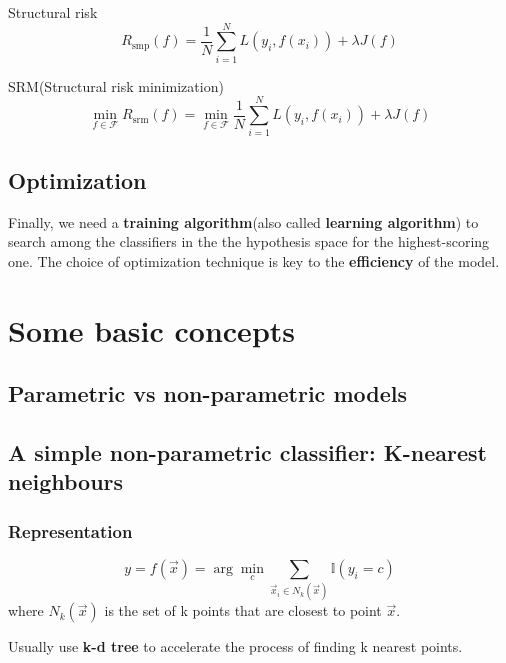 \begin{definition}
Structural risk
\begin{equation}
R_{\mathrm{smp}}(f)=\dfrac{1}{N}\sum\limits_{i=1}^{N} L\left(y_i,f(x_i)\right) +\lambda J(f)
\end{equation}
\end{definition}

\begin{definition}
SRM(Structural risk minimization)
\begin{equation}
\min\limits _{f \in \mathcal{F}} R_{\mathrm{srm}}(f)=\min\limits _{f \in \mathcal{F}} \dfrac{1}{N}\sum\limits_{i=1}^{N} L\left(y_i,f(x_i)\right) +\lambda J(f)
\end{equation}
\end{definition}


\subsection{Optimization}
Finally, we need a \textbf{training algorithm}(also called \textbf{learning algorithm}) to search among the classifiers in the the hypothesis space for the highest-scoring one. The choice of optimization technique is key to the \textbf{efficiency} of the model.


\section{Some basic concepts}


\subsection{Parametric vs non-parametric models}


\subsection{A simple non-parametric classifier: K-nearest neighbours}

\subsubsection{Representation}
\begin{equation}
y=f(\vec{x})=\arg\min_{c}{\sum\limits_{\vec{x}_i \in N_k(\vec{x})} \mathbb{I}(y_i=c)}
\end{equation}
where $N_k(\vec{x})$ is the set of k points that are closest to point $\vec{x}$.

Usually use \textbf{k-d tree} to accelerate the process of finding k nearest points.

